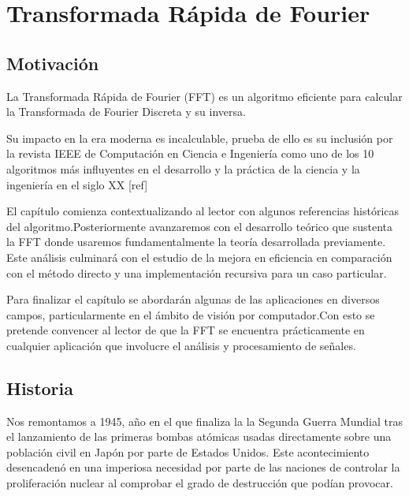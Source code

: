 \chapter{Transformada Rápida de Fourier}






\section{Motivación}
La Transformada Rápida de Fourier (FFT) es un algoritmo eficiente para calcular la Transformada de Fourier Discreta  y su inversa.

\noindent Su impacto en la era moderna es incalculable, prueba de ello es su inclusión por la revista IEEE de Computación en Ciencia e Ingeniería como uno de  los 10 algoritmos más influyentes en el desarrollo y la práctica de la ciencia y la ingeniería en el siglo XX [ref]


\noindent El capítulo comienza  contextualizando al lector con algunos referencias históricas del algoritmo.\noindent  Posteriormente avanzaremos con el desarrollo teórico que sustenta la FFT donde usaremos fundamentalmente la teoría desarrollada previamente. Este análisis  culminará con el estudio de la mejora en eficiencia en  comparación con el método directo y una implementación recursiva para un caso particular.


\noindent Para finalizar el capítulo se abordarán algunas de las aplicaciones en diversos campos, particularmente en el ámbito de visión por computador.Con esto se pretende convencer al lector de que la FFT se encuentra prácticamente en cualquier aplicación que involucre el análisis y procesamiento de señales.




\section{Historia}












Nos remontamos a 1945, año en el que finaliza la la Segunda Guerra Mundial tras el lanzamiento de las primeras bombas atómicas usadas directamente sobre una población civil en Japón por parte de Estados Unidos. Este acontecimiento desencadenó en  una imperiosa necesidad por parte de las naciones de controlar la proliferación nuclear al comprobar el grado de destrucción que podían provocar.

